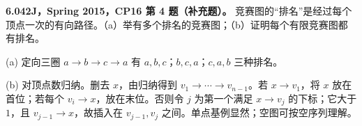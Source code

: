 \begin{exercise}\label{mit:6042-cp16-q4}
\textbf{6.042J，Spring 2015，CP16 第 4 题（补充题）。}
竞赛图的“排名”是经过每个顶点一次的有向路径。（a）举有多个排名的竞赛图；（b）证明每个有限竞赛图都有排名。
\end{exercise}
\begin{solution}
(a) 定向三圈 $a\to b\to c\to a$ 有 $a,b,c$；$b,c,a$；$c,a,b$ 三种排名。

(b) 对顶点数归纳。删去 $x$，由归纳得到 $v_1\to\cdots\to v_{n-1}$。若 $x\to v_1$，将 $x$ 放在首位；若每个 $v_i\to x$，放在末位。否则令 $j$ 为第一个满足 $x\to v_j$ 的下标；它大于 $1$，且 $v_{j-1}\to x$，故插入在 $v_{j-1},v_j$ 之间。单点基例显然；空图可按空序列理解。
\end{solution}

